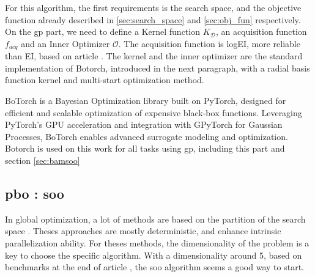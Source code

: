 For this algorithm, the first requirements is the search space, and the objective function already described in \ref{sec:search_space} and \ref{sec:obj_fun} respectively. On the \acrshort{gp} part, we need to define a Kernel function $K_\mathcal D$, an acquisition function $f_{acq}$ and an Inner Optimizer $\mathcal O$. The acquisition function is logEI, more reliable than EI, based on article \cite{ament_unexpected_2024}. The kernel and the inner optimizer are the standard implementation of Botorch, introduced in the next paragraph, with a radial basis function kernel and multi-start optimization method. 

BoTorch \cite{balandat_botorch_2020} is a Bayesian Optimization library built on PyTorch, designed for efficient and scalable optimization of expensive black-box functions. Leveraging PyTorch's GPU acceleration and integration with GPyTorch \cite{gardner_gpytorch_2021} for Gaussian Processes, BoTorch enables advanced surrogate modeling and optimization. Botorch is used on this work for all tasks using \acrshort{gp}, including this part and section \ref{sec:bamsoo}


\subsection{\acrlong{pbo} : \acrfull{soo}}
\label{sec:soo}
In global optimization, a lot of methods are based on the partition of the search space \cite{nakib_deterministic_2017,jones_lipschitzian_1993,munos_optimistic_2011}. Theses approaches are mostly deterministic, and enhance intrinsic parallelization ability. For theses methods, the dimensionality of the problem is a key to choose the specific algorithm. With a dimensionality around 5, based on benchmarks at the end of article \cite{firmin_fractal-based_2022}, the \acrfull{soo} \cite{munos_optimistic_2011} algorithm seems a good way to start. 

